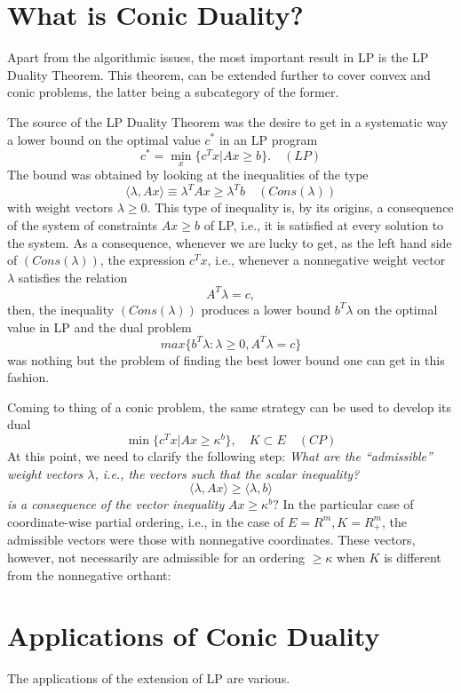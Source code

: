 \documentclass[12pt]{article}
\begin{document}
    \section{What is Conic Duality?}
    \par Apart from the algorithmic issues, the most important result in LP is the LP Duality Theorem. This theorem, can be extended further to cover convex and conic problems, the latter being a subcategory of the former. \par
    The source of the LP Duality Theorem was the desire to get in a systematic way a lower bound on the
    optimal value $c^*$ in an LP program
    $$c^* = \min\limits_{x} \{ c^T x | Ax \geq b \}. \quad (LP)$$
    The bound was obtained by looking at the inequalities of the type 
    $$\langle \lambda, Ax\rangle \equiv \lambda^T Ax \geq \lambda^T b \quad (Cons(\lambda))$$
    with weight vectors $\lambda \geq 0$. This type of inequality is, by its origins, a consequence of the system of constraints $Ax \geq b$ of LP, i.e., it is satisfied at every solution to the system. As a consequence, whenever we are lucky to get, as the left hand side of $(Cons(\lambda))$, the expression $c^T x$, i.e., whenever a nonnegative weight vector $\lambda$ satisfies the relation 
    $$A^T \lambda = c,$$
    then, the inequality $(Cons(\lambda))$ produces a lower bound $b^T \lambda$ on the optimal value in LP 
    and the dual problem 
    $$max \{b^T \lambda : \lambda \geq 0, A^T \lambda = c\}$$
    was nothing but the problem of finding the best lower bound one can get in this fashion.\par
    Coming to thing of a conic problem, the same strategy can be used to develop its dual
    $$\min \{ c^T x | Ax \geq \kappa^b \}, \quad K \subset E \quad (CP)$$
    At this point, we need to clarify the following step:\newline
    \textit{What are the “admissible” weight vectors $\lambda$, i.e., the vectors such that the scalar 
    inequality?}
    $$\langle \lambda, Ax\rangle \geq \langle \lambda, b\rangle$$
    \textit{is a consequence of the vector inequality} $Ax \geq \kappa^b ?$ \newline \newline
    In the particular case of coordinate-wise partial ordering, i.e., in the case of $E = R^m , K = R_+^m $, 
    the admissible vectors were those with nonnegative coordinates. These vectors, however, not necessarily 
    are admissible for an ordering $\geq \kappa$ when $K$ is different from the nonnegative orthant:
    
    
    \section{Applications of Conic Duality }
    \par The applications of the extension of LP are various. 
\end{document}
